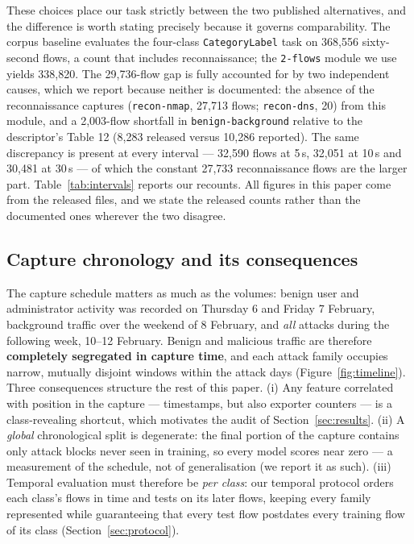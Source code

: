 \documentclass[review,12pt]{elsarticle}
\begin{document}
These choices place our task strictly between the two published
alternatives, and the difference is worth stating precisely because it
governs comparability. The corpus baseline \cite{silva2025binary} evaluates
the four-class \texttt{CategoryLabel} task on 368{,}556 sixty-second flows,
a count that includes reconnaissance; the \texttt{2-flows} module we use
yields 338{,}820. The 29{,}736-flow gap is fully accounted for by two
independent causes, which we report because neither is documented: the
absence of the reconnaissance captures (\texttt{recon-nmap}, 27{,}713 flows;
\texttt{recon-dns}, 20) from this module, and a 2{,}003-flow shortfall in
\texttt{benign-background} relative to the descriptor's Table 12
(8{,}283 released versus 10{,}286 reported). The same discrepancy is present at every
interval --- 32{,}590 flows at 5\,s, 32{,}051 at 10\,s and 30{,}481 at 30\,s --- of which
the constant 27{,}733 reconnaissance flows are the larger part.
Table~\ref{tab:intervals} reports our recounts. All figures in this paper come from the
released files, and we state the released counts rather than the documented ones wherever
the two disagree.

\subsection{Capture chronology and its consequences}
\label{sec:chronology}
The capture schedule matters as much as the volumes: benign user and
administrator activity was recorded on Thursday 6 and Friday 7 February,
background traffic over the weekend of 8 February, and \emph{all} attacks
during the following week, 10--12 February. Benign and malicious traffic
are therefore \textbf{completely segregated in capture time}, and each
attack family occupies narrow, mutually disjoint windows within the attack
days (Figure~\ref{fig:timeline}). Three consequences structure the rest of
this paper. (i) Any feature correlated with position in the capture ---
timestamps, but also exporter counters --- is a class-revealing shortcut,
which motivates the audit of Section~\ref{sec:results}. (ii) A
\emph{global} chronological split is degenerate: the final portion of the
capture contains only attack blocks never seen in training, so every model
scores near zero --- a measurement of the schedule, not of generalisation
(we report it as such). (iii) Temporal evaluation must therefore be
\emph{per class}: our temporal protocol orders each class's flows in time
and tests on its later flows, keeping every family represented while
guaranteeing that every test flow postdates every training flow of its
class (Section~\ref{sec:protocol}).
\end{document}
